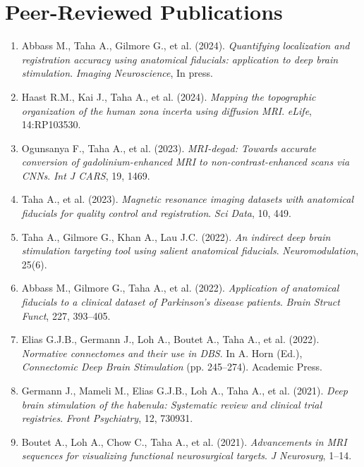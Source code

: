 \section*{Peer-Reviewed Publications} \sectionline
\begin{enumerate}
  \item Abbass M., Taha A., Gilmore G., et al. (2024). \textit{Quantifying localization and registration accuracy using anatomical fiducials: application to deep brain stimulation}. \textit{Imaging Neuroscience}, In press.
  \item Haast R.M., Kai J., Taha A., et al. (2024). \textit{Mapping the topographic organization of the human zona incerta using diffusion MRI}. \textit{eLife}, 14:RP103530.
  \item Ogunsanya F., Taha A., et al. (2023). \textit{MRI-degad: Towards accurate conversion of gadolinium-enhanced MRI to non-contrast-enhanced scans via CNNs}. \textit{Int J CARS}, 19, 1469.
  \item Taha A., et al. (2023). \textit{Magnetic resonance imaging datasets with anatomical fiducials for quality control and registration}. \textit{Sci Data}, 10, 449.
  \item Taha A., Gilmore G., Khan A., Lau J.C. (2022). \textit{An indirect deep brain stimulation targeting tool using salient anatomical fiducials}. \textit{Neuromodulation}, 25(6).
  \item Abbass M., Gilmore G., Taha A., et al. (2022). \textit{Application of anatomical fiducials to a clinical dataset of Parkinson’s disease patients}. \textit{Brain Struct Funct}, 227, 393–405.
  \item Elias G.J.B., Germann J., Loh A., Boutet A., Taha A., et al. (2022). \textit{Normative connectomes and their use in DBS}. In A. Horn (Ed.), \textit{Connectomic Deep Brain Stimulation} (pp. 245–274). Academic Press.
  \item Germann J., Mameli M., Elias G.J.B., Loh A., Taha A., et al. (2021). \textit{Deep brain stimulation of the habenula: Systematic review and clinical trial registries}. \textit{Front Psychiatry}, 12, 730931.
  \item Boutet A., Loh A., Chow C., Taha A., et al. (2021). \textit{Advancements in MRI sequences for visualizing functional neurosurgical targets}. \textit{J Neurosurg}, 1–14.
\end{enumerate}

